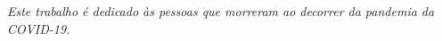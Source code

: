 \begin{dedicatoria}
  \vspace*{\fill}
  \centering
  \noindent
  \textit{Este trabalho é dedicado às pessoas que morreram ao decorrer da pandemia da COVID-19.} \vspace*{\fill}
\end{dedicatoria}
